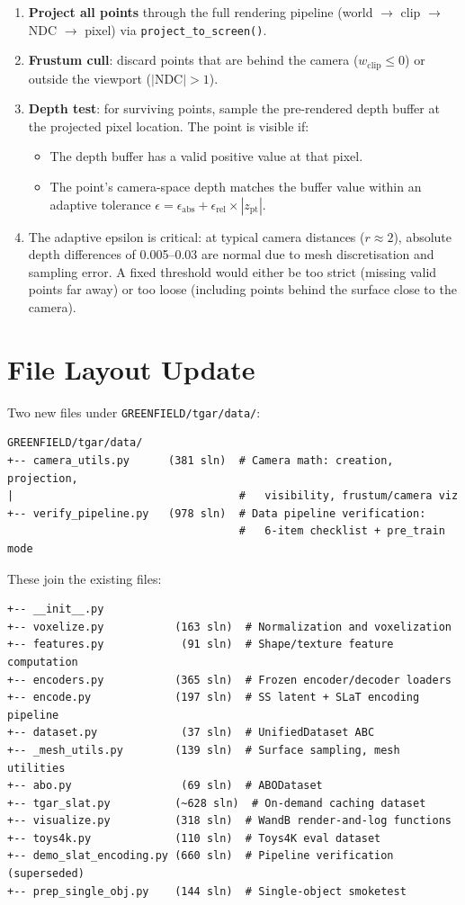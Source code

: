 \begin{enumerate}
  \item \textbf{Project all points} through the full rendering pipeline
  (world $\to$ clip $\to$ NDC $\to$ pixel) via \texttt{project\_to\_screen()}.
  \item \textbf{Frustum cull}: discard points that are behind the camera
  ($w_{\text{clip}} \le 0$) or outside the viewport ($|\text{NDC}| > 1$).
  \item \textbf{Depth test}: for surviving points, sample the pre-rendered
  depth buffer at the projected pixel location. The point is visible if:
  \begin{itemize}
    \item The depth buffer has a valid positive value at that pixel.
    \item The point's camera-space depth matches the buffer value within
    an adaptive tolerance $\epsilon = \epsilon_{\text{abs}} + \epsilon_{\text{rel}} \times |z_{\text{pt}}|$.
  \end{itemize}
  \item The adaptive epsilon is critical: at typical camera distances
  ($r \approx 2$), absolute depth differences of 0.005--0.03 are normal
  due to mesh discretisation and sampling error. A fixed threshold would
  either be too strict (missing valid points far away) or too loose
  (including points behind the surface close to the camera).
\end{enumerate}

\section{File Layout Update}

Two new files under \texttt{GREENFIELD/tgar/data/}:

\begin{lstlisting}
GREENFIELD/tgar/data/
+-- camera_utils.py      (381 sln)  # Camera math: creation, projection,
|                                   #   visibility, frustum/camera viz
+-- verify_pipeline.py   (978 sln)  # Data pipeline verification:
                                    #   6-item checklist + pre_train mode
\end{lstlisting}

These join the existing files:
\begin{lstlisting}
+-- __init__.py
+-- voxelize.py           (163 sln)  # Normalization and voxelization
+-- features.py            (91 sln)  # Shape/texture feature computation
+-- encoders.py           (365 sln)  # Frozen encoder/decoder loaders
+-- encode.py             (197 sln)  # SS latent + SLaT encoding pipeline
+-- dataset.py             (37 sln)  # UnifiedDataset ABC
+-- _mesh_utils.py        (139 sln)  # Surface sampling, mesh utilities
+-- abo.py                 (69 sln)  # ABODataset
+-- tgar_slat.py          (~628 sln)  # On-demand caching dataset
+-- visualize.py          (318 sln)  # WandB render-and-log functions
+-- toys4k.py             (110 sln)  # Toys4K eval dataset
+-- demo_slat_encoding.py (660 sln)  # Pipeline verification (superseded)
+-- prep_single_obj.py    (144 sln)  # Single-object smoketest
\end{lstlisting}

